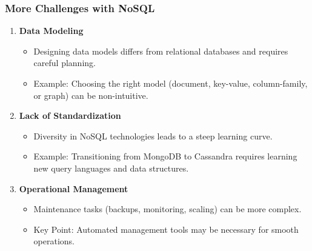 \documentclass[aspectratio=169]{beamer}
\begin{document}
\begin{frame}[fragile]
    \frametitle{More Challenges with NoSQL}
    
    \begin{enumerate}[resume]
        \item \textbf{Data Modeling}
            \begin{itemize}
                \item Designing data models differs from relational databases and requires careful planning.
                \item Example: Choosing the right model (document, key-value, column-family, or graph) can be non-intuitive.
            \end{itemize}
        
        \item \textbf{Lack of Standardization}
            \begin{itemize}
                \item Diversity in NoSQL technologies leads to a steep learning curve.
                \item Example: Transitioning from MongoDB to Cassandra requires learning new query languages and data structures.
            \end{itemize}
        
        \item \textbf{Operational Management}
            \begin{itemize}
                \item Maintenance tasks (backups, monitoring, scaling) can be more complex.
                \item Key Point: Automated management tools may be necessary for smooth operations.
            \end{itemize}
    \end{enumerate}
\end{frame}
\end{document}

